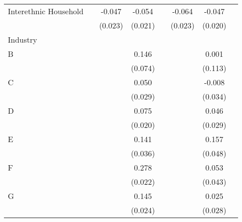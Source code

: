\begin{longtable}{l*{3}{c}|l*{3}{c}}
		Interethnic Household        &                     &      -0.047\sym{*}  &      -0.054\sym{*}  &                     &      -0.064\sym{**} &      -0.047\sym{*}  \\
		&                     &     (0.023)         &     (0.021)         &                     &     (0.023)         &     (0.020)         \\
		Industry &&&&&\\
		B                   &                     &                     &       0.146\sym{*}  &                     &                     &       0.001         \\
		&                     &                     &     (0.074)         &                     &                     &     (0.113)         \\
		C                   &                     &                     &       0.050         &                     &                     &      -0.008         \\
		&                     &                     &     (0.029)         &                     &                     &     (0.034)         \\
		D                   &                     &                     &       0.075\sym{***}&                     &                     &       0.046         \\
		&                     &                     &     (0.020)         &                     &                     &     (0.029)         \\
		E                   &                     &                     &       0.141\sym{***}&                     &                     &       0.157\sym{**} \\
		&                     &                     &     (0.036)         &                     &                     &     (0.048)         \\
		F                   &                     &                     &       0.278\sym{***}&                     &                     &       0.053         \\
		&                     &                     &     (0.022)         &                     &                     &     (0.043)         \\
		G                   &                     &                     &       0.145\sym{***}&                     &                     &       0.025         \\
		&                     &                     &     (0.024)         &                     &                     &     (0.028)         \\

\end{longtable}
